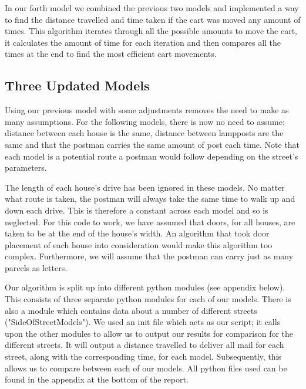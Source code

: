 \documentclass[14pt]{article}
\begin{document}
In our forth model we combined the previous two models and implemented a way to find the distance travelled and time taken if the cart was moved any amount of times. This algorithm iterates through all the possible amounts to move the cart, it calculates the amount of time for each iteration and then compares all the times at the end to find the most efficient cart movements.

\subsection{Three Updated Models}

Using our previous model with some adjustments removes the need to make as many assumptions. For the following models, there is now no need to assume: distance between each house is the same, distance between lampposts are the same and that the postman carries the same amount of post each time. Note that each model is a potential route a postman would follow depending on the street's parameters. 

The length of each house's drive has been ignored in these models. No matter what route is taken, the postman will always take the same time to walk up and down each drive. This is therefore a constant across each model and so is neglected. For this code to work, we have assumed that doors, for all houses, are taken to be at the end of the house's width. An algorithm that took door placement of each house into consideration would make this algorithm too complex. Furthermore, we will assume that the postman can carry just as many parcels as letters. 

Our algorithm is split up into different python modules (see appendix below). This consists of three separate python modules for each of our models. There is also a module which contains data about a number of different streets ("SideOfStreetModels"). We used an init file which acts as our script; it calls upon the other modules to allow us to output our results for comparison for the different streets. It will output a distance travelled to deliver all mail for each street, along with the corresponding time, for each model. Subsequently, this allows us to compare between each of our models. All python files used can be found in the appendix at the bottom of the report. 
\end{document}
